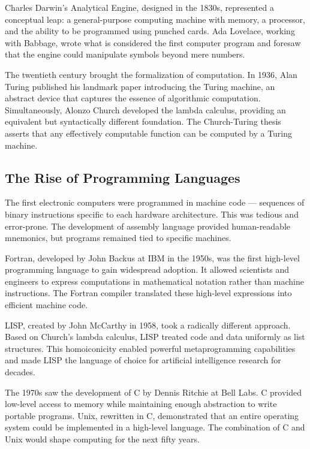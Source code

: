 \documentclass[11pt]{article}
\begin{document}
Charles Darwin's Analytical Engine, designed in the 1830s, represented a
conceptual leap: a general-purpose computing machine with memory, a processor,
and the ability to be programmed using punched cards. Ada Lovelace, working
with Babbage, wrote what is considered the first computer program and foresaw
that the engine could manipulate symbols beyond mere numbers.

The twentieth century brought the formalization of computation. In 1936,
Alan Turing published his landmark paper introducing the Turing machine,
an abstract device that captures the essence of algorithmic computation.
Simultaneously, Alonzo Church developed the lambda calculus, providing an
equivalent but syntactically different foundation. The Church-Turing thesis
asserts that any effectively computable function can be computed by a
Turing machine.

\subsection{The Rise of Programming Languages}

The first electronic computers were programmed in machine code --- sequences
of binary instructions specific to each hardware architecture. This was
tedious and error-prone. The development of assembly language provided
human-readable mnemonics, but programs remained tied to specific machines.

Fortran, developed by John Backus at IBM in the 1950s, was the first
high-level programming language to gain widespread adoption. It allowed
scientists and engineers to express computations in mathematical notation
rather than machine instructions. The Fortran compiler translated these
high-level expressions into efficient machine code.

LISP, created by John McCarthy in 1958, took a radically different approach.
Based on Church's lambda calculus, LISP treated code and data uniformly as
list structures. This homoiconicity enabled powerful metaprogramming
capabilities and made LISP the language of choice for artificial intelligence
research for decades.

The 1970s saw the development of C by Dennis Ritchie at Bell Labs. C provided
low-level access to memory while maintaining enough abstraction to write
portable programs. Unix, rewritten in C, demonstrated that an entire operating
system could be implemented in a high-level language. The combination of C
and Unix would shape computing for the next fifty years.
\end{document}
